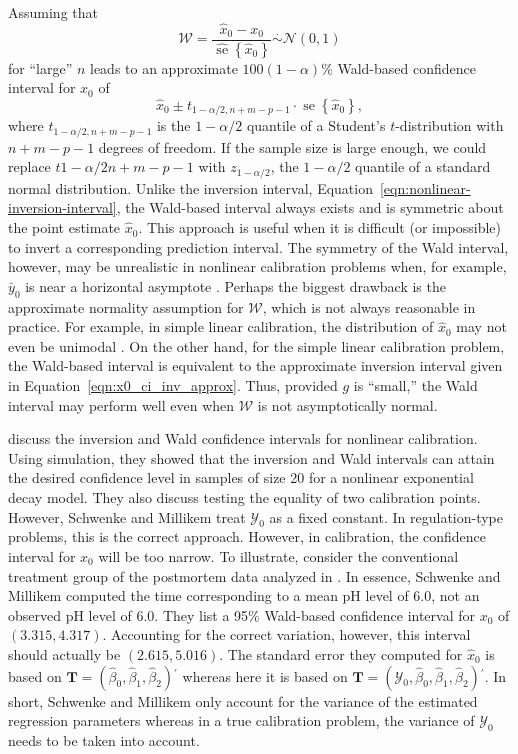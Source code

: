 \documentclass[cmfont,usenames,dvipsnames,leqno]{afit-etd}\usepackage[]{graphicx}\usepackage[]{color}
\newcommand{\trans}{\ensuremath{^\prime}}
\newcommand{\mc}[1]{\ensuremath{\mathcal{#1}}}
\newcommand{\wh}[1]{\ensuremath{\widehat{#1}}}
\newcommand{\tquant}[2]{\ensuremath{t_{#1,#2}}}
\newcommand{\se}{\operatorname{se}}
\begin{document}
Assuming that
\begin{equation}
\label{eqn:approx_pivot}
  \mc{W} = \frac{\wh{x}_0 - x_0}{\wh{\se}\left\{\wh{x}_0\right\}} \stackrel{\cdot}{\sim} \mc{N}(0, 1)
\end{equation}
for ``large'' $n$ leads to an approximate $100(1-\alpha)\%$ Wald-based confidence interval for $x_0$ of 
\begin{equation}
\label{eqn:x0_ci_wald}
  \wh{x}_0 \pm \tquant{1-\alpha/2}{n+m-p-1} \cdot \wh{\se}\left\{\wh{x}_0\right\},
\end{equation}
where $\tquant{1-\alpha/2}{n+m-p-1}$ is the $1-\alpha/2$ quantile of a Student's $t$-distribution with $n+m-p-1$ degrees of freedom. If the sample size is large enough, we could replace $t{1-\alpha/2}{n+m-p-1}$ with $z_{1-\alpha/2}$, the $1-\alpha/2$ quantile of a standard normal distribution. Unlike the inversion interval, Equation~\eqref{eqn:nonlinear-inversion-interval}, the Wald-based interval always exists and is symmetric about the point estimate $\wh{x}_0$. This approach is useful when it is difficult (or impossible) to invert a corresponding prediction interval. The symmetry of the Wald interval, however, may be unrealistic in nonlinear calibration problems when, for example, $\bar{y}_0$ is near a horizontal asymptote \citep{schwenke_callibration_1991}. Perhaps the biggest drawback is the approximate normality assumption for $\mc{W}$, which is not always reasonable in practice. For example, in simple linear calibration, the distribution of $\wh{x}_0$ may not even be unimodal \citep{buonaccorsi_design_1986}. On the other hand, for the simple linear calibration problem, the Wald-based interval is equivalent to the approximate inversion interval given in Equation~\eqref{eqn:x0_ci_inv_approx}. Thus, provided $g$ is ``small,'' the Wald interval may perform well even when $\mc{W}$ is not asymptotically normal.

\citet{schwenke_callibration_1991} discuss the inversion and Wald confidence intervals for nonlinear calibration. Using simulation, they showed that the inversion and Wald intervals can attain the desired confidence level in samples of size 20 for a nonlinear exponential decay model. They also discuss testing the equality of two calibration points. However, Schwenke and Millikem treat $\mc{Y}_0$ as a fixed constant. In regulation-type problems, this is the correct approach. However, in calibration, the confidence interval for $x_0$ will be too narrow. To illustrate, consider the conventional treatment group of the postmortem data analyzed in \citet{schwenke_callibration_1991}. In essence, Schwenke and Millikem computed the time corresponding to a mean pH level of 6.0, not an observed pH level of 6.0. They list a 95\% Wald-based confidence interval for $x_0$ of $(3.315, 4.317)$. Accounting for the correct variation, however, this interval should actually be $(2.615, 5.016)$. The standard error they computed for $\wh{x}_0$ is based on $\bm{T} = (\wh{\beta}_0, \wh{\beta}_1, \wh{\beta}_2)\trans$ whereas here it is based on $\bm{T} = (\mc{Y}_0, \wh{\beta}_0, \wh{\beta}_1, \wh{\beta}_2)\trans$. In short, Schwenke and Millikem only account for the variance of the estimated regression parameters whereas in a true calibration problem, the variance of $\mc{Y}_0$ needs to be taken into account. 
\end{document}
